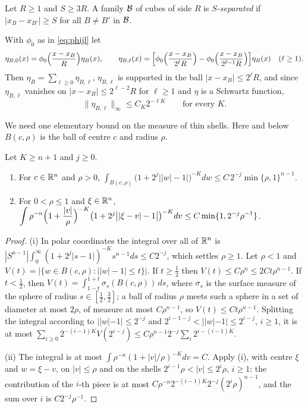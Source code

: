 \begin{definition}\label{def:separated}
Let $R\ge1$ and $S\ge3R$. A family $\mathcal B$ of cubes of side $R$ is \emph{$S$-separated} if
$|x_B-x_{B'}|\ge S$ for all $B\ne B'$ in $\mathcal B$.
\end{definition}

With $\phi_0$ as in \eqref{eq:phijl} let
\begin{equation}\label{eq:etaBl}
\eta_{B,0}(x)=\phi_0\Bigl(\frac{x-x_B}R\Bigr)\eta_B(x),\qquad
\eta_{B,\ell}(x)=\Bigl[\phi_0\Bigl(\frac{x-x_B}{2^\ell R}\Bigr)-\phi_0\Bigl(\frac{x-x_B}{2^{\ell-1}R}\Bigr)\Bigr]\eta_B(x)
\quad(\ell\ge1).
\end{equation}
Then $\eta_B=\sum_{\ell\ge0}\eta_{B,\ell}$, $\eta_{B,\ell}$ is supported in the ball $|x-x_B|\le2^\ell R$, and
since $\eta_{B,\ell}$ vanishes on $|x-x_B|\le2^{\ell-2}R$ for $\ell\ge1$ and $\eta$ is a Schwartz function,
\begin{equation}\label{eq:etaBlsup}
\|\eta_{B,\ell}\|_\infty\le C_K2^{-\ell K}\qquad\text{for every }K .
\end{equation}

We need one elementary bound on the measure of thin shells. Here and below $B(c,\rho)$ is the ball
of centre $c$ and radius $\rho$.

\begin{lemma}\label{lem:shellmeasure}
Let $K\ge n+1$ and $j\ge0$.
\begin{enumerate}[label=\textup{(\roman*)}]
\item For $c\in\mathbb{R}^n$ and $\rho>0$,
$\displaystyle\int_{B(c,\rho)}\bigl(1+2^j\bigl||w|-1\bigr|\bigr)^{-K}dw\le C\,2^{-j}\min\{\rho,1\}^{n-1}$.
\item For $0<\rho\le1$ and $\xi\in\mathbb{R}^n$,
$\displaystyle\int\rho^{-n}\Bigl(1+\frac{|v|}\rho\Bigr)^{-K}\bigl(1+2^j\bigl||\xi-v|-1\bigr|\bigr)^{-K}dv
\le C\min\{1,2^{-j}\rho^{-1}\}$.
\end{enumerate}
\end{lemma}

\begin{proof}
(i) In polar coordinates the integral over all of $\mathbb{R}^n$ is
$|S^{n-1}|\int_0^\infty(1+2^j|s-1|)^{-K}s^{n-1}ds\le C2^{-j}$, which settles $\rho\ge1$. Let $\rho<1$ and
$V(t)=|\{w\in B(c,\rho):||w|-1|\le t\}|$. If $t\ge\frac12$ then $V(t)\le C\rho^n\le2Ct\rho^{n-1}$. If
$t<\frac12$, then $V(t)=\int_{1-t}^{1+t}\sigma_s(B(c,\rho))\,ds$, where $\sigma_s$ is the surface measure of
the sphere of radius $s\in[\frac12,\frac32]$; a ball of radius $\rho$ meets such a sphere in a set of
diameter at most $2\rho$, of measure at most $C\rho^{n-1}$, so $V(t)\le Ct\rho^{n-1}$. Splitting the
integral according to $||w|-1|\le2^{-j}$ and $2^{i-1-j}<||w|-1|\le2^{i-j}$, $i\ge1$, it is at most
$\sum_{i\ge0}2^{-(i-1)K}V(2^{i-j})\le C\rho^{n-1}2^{-j}\sum_i2^{i-(i-1)K}$.

(ii) The integral is at most $\int\rho^{-n}(1+|v|/\rho)^{-K}dv=C$. Apply (i), with centre $\xi$ and $w=\xi-v$,
on $|v|\le\rho$ and on the shells $2^{i-1}\rho<|v|\le2^i\rho$, $i\ge1$: the contribution of the $i$-th
piece is at most $C\rho^{-n}2^{-(i-1)K}2^{-j}(2^i\rho)^{n-1}$, and the sum over $i$ is
$C2^{-j}\rho^{-1}$.
\end{proof}

